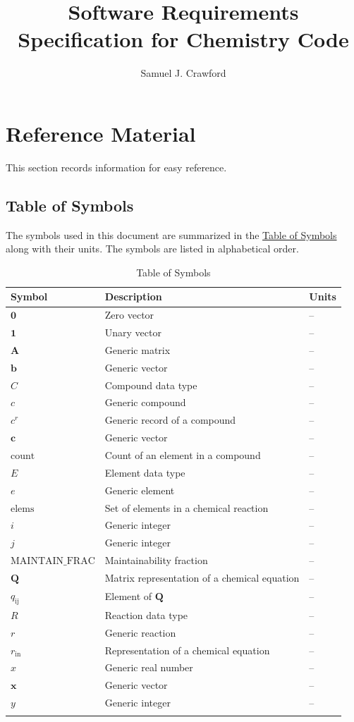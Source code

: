 \documentclass[12pt]{article}
\title{Software Requirements Specification for Chemistry Code}
\author{Samuel J. Crawford}
\begin{document}
\maketitle
\tableofcontents
\newpage
\section{Reference Material}
\label{Sec:RefMat}
This section records information for easy reference.

\subsection{Table of Symbols}
\label{Sec:ToS}
The symbols used in this document are summarized in the \hyperref[Table:ToS]{Table of Symbols} along with their units. The symbols are listed in alphabetical order.

\begin{longtable}{l l l}
\toprule
\textbf{Symbol} & \textbf{Description} & \textbf{Units}
\\
\midrule
\endhead
$\symbf{0}$ & Zero vector & --
\\
$\symbf{1}$ & Unary vector & --
\\
$\symbf{A}$ & Generic matrix & --
\\
$\symbf{b}$ & Generic vector & --
\\
$C$ & Compound data type & --
\\
$c$ & Generic compound & --
\\
${c^{r}}$ & Generic record of a compound & --
\\
$\symbf{c}$ & Generic vector & --
\\
$\text{count}$ & Count of an element in a compound & --
\\
$E$ & Element data type & --
\\
$e$ & Generic element & --
\\
$\text{elems}$ & Set of elements in a chemical reaction & --
\\
$i$ & Generic integer & --
\\
$j$ & Generic integer & --
\\
$\text{MAINTAIN_FRAC}$ & Maintainability fraction & --
\\
$\symbf{Q}$ & Matrix representation of a chemical equation & --
\\
${q_{\text{ij}}}$ & Element of $\symbf{Q}$ & --
\\
$R$ & Reaction data type & --
\\
$r$ & Generic reaction & --
\\
${r_{\text{in}}}$ & Representation of a chemical equation & --
\\
$x$ & Generic real number & --
\\
$\symbf{x}$ & Generic vector & --
\\
$y$ & Generic integer & --
\\
\bottomrule
\caption{Table of Symbols}
\label{Table:ToS}
\end{longtable}
\end{document}
